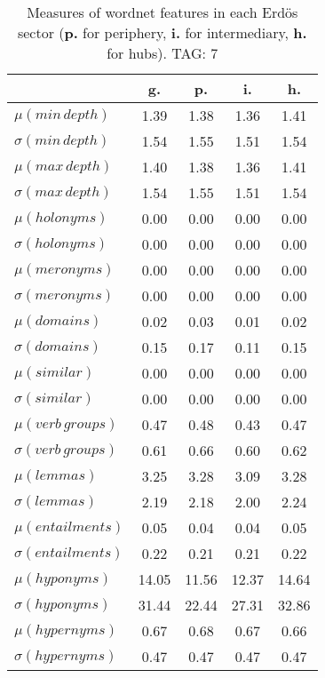 \begin{table}[h!]
\begin{center}
\begin{tabular}{| l || c | c | c | c |}\hline
 & {\bf g.} & {\bf p.} & {\bf i.} & {\bf h.} \\\hline\hline
$\mu(min\,depth)$ & 1.39  & 1.38  & 1.36  & 1.41 \\
$\sigma(min\,depth)$ & 1.54  & 1.55  & 1.51  & 1.54 \\\hline
$\mu(max\,depth)$ & 1.40  & 1.38  & 1.36  & 1.41 \\
$\sigma(max\,depth)$ & 1.54  & 1.55  & 1.51  & 1.54 \\\hline
$\mu(holonyms)$ & 0.00  & 0.00  & 0.00  & 0.00 \\
$\sigma(holonyms)$ & 0.00  & 0.00  & 0.00  & 0.00 \\\hline
$\mu(meronyms)$ & 0.00  & 0.00  & 0.00  & 0.00 \\
$\sigma(meronyms)$ & 0.00  & 0.00  & 0.00  & 0.00 \\\hline
$\mu(domains)$ & 0.02  & 0.03  & 0.01  & 0.02 \\
$\sigma(domains)$ & 0.15  & 0.17  & 0.11  & 0.15 \\\hline
$\mu(similar)$ & 0.00  & 0.00  & 0.00  & 0.00 \\
$\sigma(similar)$ & 0.00  & 0.00  & 0.00  & 0.00 \\\hline
$\mu(verb\,groups)$ & 0.47  & 0.48  & 0.43  & 0.47 \\
$\sigma(verb\,groups)$ & 0.61  & 0.66  & 0.60  & 0.62 \\\hline
$\mu(lemmas)$ & 3.25  & 3.28  & 3.09  & 3.28 \\
$\sigma(lemmas)$ & 2.19  & 2.18  & 2.00  & 2.24 \\\hline
$\mu(entailments)$ & 0.05  & 0.04  & 0.04  & 0.05 \\
$\sigma(entailments)$ & 0.22  & 0.21  & 0.21  & 0.22 \\\hline
$\mu(hyponyms)$ & 14.05  & 11.56  & 12.37  & 14.64 \\
$\sigma(hyponyms)$ & 31.44  & 22.44  & 27.31  & 32.86 \\\hline
$\mu(hypernyms)$ & 0.67  & 0.68  & 0.67  & 0.66 \\
$\sigma(hypernyms)$ & 0.47  & 0.47  & 0.47  & 0.47 \\\hline
\end{tabular}
\caption{Measures of wordnet features in each Erd\"os sector ({{\bf p.}} for periphery, {{\bf i.}} for intermediary, {{\bf h.}} for hubs). TAG: 7}
\end{center}
\end{table}